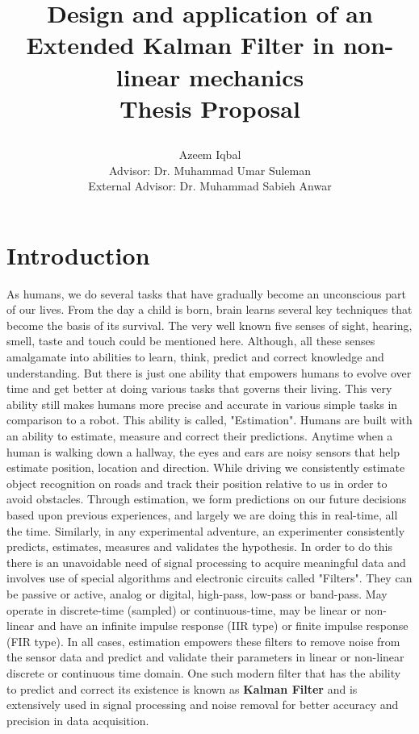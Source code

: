 \documentclass[12pt,twoside,a4]{article}
\begin{document}
\title{\textbf{Design and application of an Extended Kalman Filter in non-linear mechanics \\ Thesis Proposal}
\author{Azeem Iqbal\\ Advisor: Dr. Muhammad Umar Suleman \\ External Advisor: Dr. Muhammad Sabieh Anwar}}
\maketitle



{\section{Introduction}}
As humans, we do several tasks that have gradually become an unconscious part of our lives. From the day a child is born, brain learns several key techniques that become the basis of its survival. The very well known five senses of sight, hearing, smell, taste and touch could be mentioned here. Although, all these senses amalgamate into abilities to learn, think, predict and correct knowledge and understanding. But there is just one ability that empowers humans to evolve over time and get better at doing various tasks that governs their living. This very ability still makes humans more precise and accurate in various simple tasks in comparison to a robot. This ability is called, "Estimation". Humans are built with an ability to estimate, measure and correct their predictions. Anytime when a human is walking down a hallway, the eyes and ears are noisy sensors that help estimate position, location and direction. While driving we consistently estimate object recognition on roads and track their position relative to us in order to avoid obstacles. Through estimation, we form predictions on our future decisions based upon previous experiences, and largely we are doing this in real-time, all the time. Similarly, in any experimental adventure, an experimenter consistently predicts, estimates, measures and validates the hypothesis. In order to do this there is an unavoidable need of signal processing to acquire meaningful data and involves use of special algorithms and electronic circuits called "Filters". They can be passive or active, analog or digital, high-pass, low-pass or band-pass. May operate in discrete-time (sampled) or continuous-time, may be linear or non-linear and have an infinite impulse response (IIR type) or finite impulse response (FIR type). In all cases, estimation empowers these filters to remove noise from the sensor data and predict and validate their parameters in linear or non-linear discrete or continuous time domain. One such modern filter that has the ability to predict and correct its existence is known as \textbf{Kalman Filter} and is extensively used in signal processing and noise removal for better accuracy and precision in data acquisition.
\end{document}
